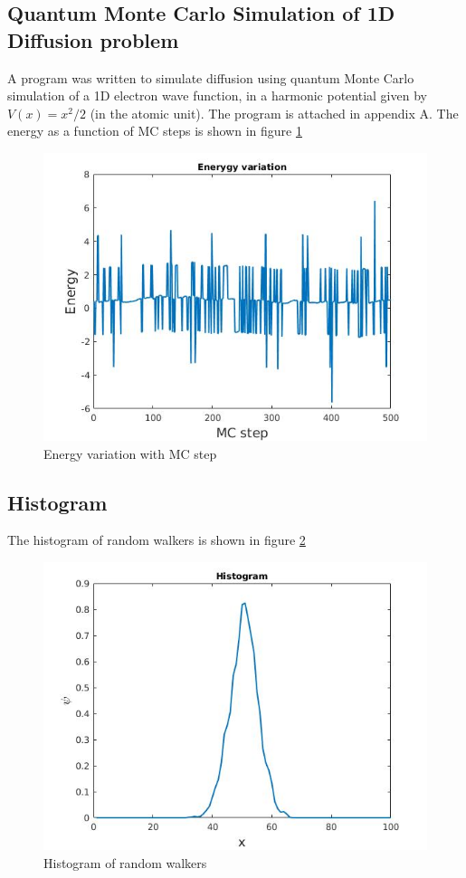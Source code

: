\documentclass[11pt, oneside]{article}   	%
\begin{document}
\subsection{\vspace{-2ex} Quantum Monte Carlo Simulation of 1D Diffusion problem}
A program was written to simulate diffusion using quantum Monte Carlo simulation of a 1D electron wave function, in a harmonic potential given by $V(x) = x^2/2$ (in the atomic unit). The program is attached in appendix A. The energy as a function of MC steps is shown in figure \ref{energy}
	\begin{figure}[!htbp] \label{energy}
	\centering
	\includegraphics[scale=0.45]{energyVariation.jpg}
	\caption{Energy variation with MC step}
	\end{figure} \vspace{-2ex}
	
\subsection{\vspace{-2ex} Histogram}
The histogram of random walkers is shown in figure \ref{qmc}
	\begin{figure}[!htbp] \label{qmc}
	\centering
	\includegraphics[scale=0.45]{qmcHistogram.jpg}
	\caption{Histogram of random walkers}
	\end{figure}
\end{document}
